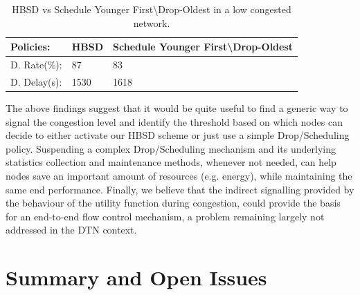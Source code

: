 \begin{table}[!h]
\renewcommand{\arraystretch}{1.1}
\caption{HBSD vs Schedule Younger First\textbackslash Drop-Oldest in a low congested network.}
\centering
\footnotesize
\begin{tabular}{|p{1.8cm}||p{2cm}||p{6cm}|}
\hline
\bfseries Policies: & HBSD & Schedule Younger First\textbackslash Drop-Oldest\\
\hline\hline
D. Rate(\%):&87&83\\
\hline\hline
D. Delay(s):&1530&1618\\
\hline
\end{tabular}
\label{DO-HBSD-LC}
\end{table}

The above findings suggest that it would be quite useful to find a generic way to signal the congestion level and identify the threshold based on which nodes can decide to either activate our HBSD scheme or just use a simple Drop/Scheduling policy. Suspending a complex Drop/Scheduling mechanism and its underlying statistics collection and maintenance methods, whenever not needed, can help nodes save an important amount of resources (e.g. energy), while maintaining the same end performance. Finally, we believe that the indirect signalling provided by the behaviour of the utility function during congestion, could provide the basis for an end-to-end flow control mechanism, a problem remaining largely not addressed in the DTN context.



\section{Summary and Open Issues}